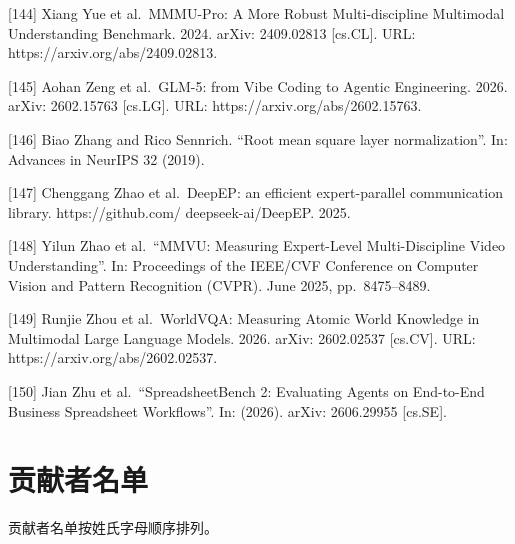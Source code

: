 \documentclass[
  10
]{article}
\begin{document}
{[}144{]} Xiang Yue et al.~MMMU-Pro: A More Robust Multi-discipline
Multimodal Understanding Benchmark. 2024. arXiv: 2409.02813 {[}cs.CL{]}.
URL: https://arxiv.org/abs/2409.02813.

{[}145{]} Aohan Zeng et al.~GLM-5: from Vibe Coding to Agentic
Engineering. 2026. arXiv: 2602.15763 {[}cs.LG{]}. URL:
https://arxiv.org/abs/2602.15763.

{[}146{]} Biao Zhang and Rico Sennrich. ``Root mean square layer
normalization''. In: Advances in NeurIPS 32 (2019).

{[}147{]} Chenggang Zhao et al.~DeepEP: an efficient expert-parallel
communication library. https://github.com/ deepseek-ai/DeepEP. 2025.

{[}148{]} Yilun Zhao et al.~``MMVU: Measuring Expert-Level
Multi-Discipline Video Understanding''. In: Proceedings of the IEEE/CVF
Conference on Computer Vision and Pattern Recognition (CVPR). June 2025,
pp.~8475--8489.

{[}149{]} Runjie Zhou et al.~WorldVQA: Measuring Atomic World Knowledge
in Multimodal Large Language Models. 2026. arXiv: 2602.02537
{[}cs.CV{]}. URL: https://arxiv.org/abs/2602.02537.

{[}150{]} Jian Zhu et al.~``SpreadsheetBench 2: Evaluating Agents on
End-to-End Business Spreadsheet Workflows''. In: (2026). arXiv:
2606.29955 {[}cs.SE{]}.

\section{贡献者名单}\label{a-contributions}

贡献者名单按姓氏字母顺序排列。
\end{document}
